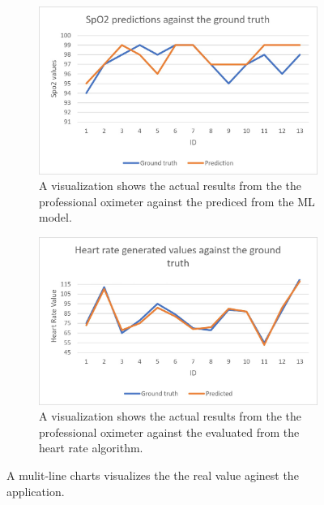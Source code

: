 \documentclass{bmcart}
\begin{document}
\begin{figure}[h!]
  \begin{subfigure}{0.45\textwidth}
  \includegraphics[width=\linewidth]{png_images/spo2_results_viz.png}
  \caption{
      A visualization shows the actual results from the the professional
      oximeter against the prediced from the ML model.}
    \end{subfigure}
    \begin{subfigure}{0.45\textwidth}
    \includegraphics[width=\linewidth]{png_images/heartrate_results_viz.png}
  \caption{
  A visualization shows the actual results from the the professional
  oximeter against the evaluated from the heart rate algorithm.}
    \end{subfigure}
    \caption{
    A mulit-line charts visualizes the the real value aginest the application.}
    \end{figure}
\FloatBarrier
\end{document}
